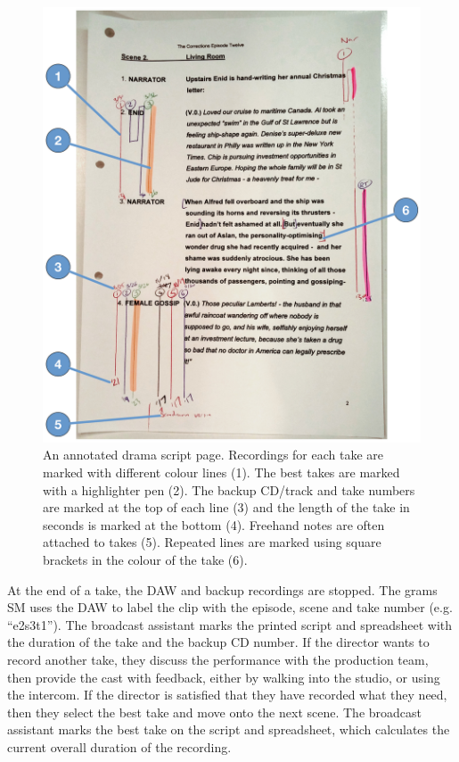 \begin{figure}
  \centering
  \includegraphics[width=\columnwidth]{figs/drama-markup-labelled.pdf}
  \caption{An annotated drama script page. Recordings for each take are marked with different colour lines (1). The
    best takes are marked with a highlighter pen (2). The backup CD/track and take numbers are marked at the top of
    each line (3) and the length of the take in seconds is marked at the bottom (4). Freehand notes are often attached
    to takes (5). Repeated lines are marked using square brackets in the colour of the take (6).}
  \label{fig:drama-script}
\end{figure}

At the end of a take, the DAW and backup recordings are stopped. The grams SM uses the DAW to label the clip with the
episode, scene and take number (e.g. ``e2s3t1''). The broadcast assistant marks the printed script and spreadsheet with
the duration of the take and the backup CD number.  If the director wants to record another take, they discuss the
performance with the production team, then provide the cast with feedback, either by walking into the studio, or using
the intercom.  If the director is satisfied that they have recorded what they need, then they select the best take and
move onto the next scene. The broadcast assistant marks the best take on the script and spreadsheet, which calculates
the current overall duration of the recording.

